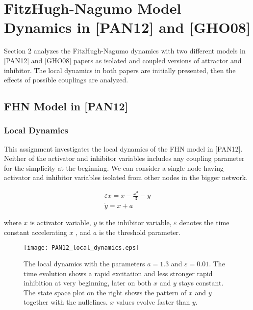 \documentclass[12pt]{article}
\begin{document}
\newpage

\section{FitzHugh-Nagumo Model Dynamics in [PAN12] and [GHO08]}

Section 2 analyzes the FitzHugh-Nagumo dynamics with two different models in [PAN12] and [GHO08] papers as isolated and coupled versions of attractor and inhibitor. The local dynamics in both papers are initially presented, then the effects of possible couplings are analyzed. 

\subsection{FHN Model in [PAN12]}

\subsubsection{Local Dynamics}

This assignment investigates the local dynamics of the FHN model in [PAN12]. Neither of the activator and inhibitor variables includes any coupling parameter for the simplicity at the beginning. We can consider a single node having activator and inhibitor variables isolated from other nodes in the bigger network. 
   
\begin{subequations} \begin{align} \varepsilon  \dot{x} = x - \frac{x^3}{3} -y   \label{eqn: frobenius 6}\\  \dot{y} = x+a \label{eqn: frobenius 7}   \end{align} 
\end{subequations}

where $x$ is activator variable, $y$ is the inhibitor variable, $\varepsilon$ denotes the time constant accelerating $x$ , and $a$ is the threshold parameter. 


\begin{figure}[h!]
	\centering
	\texttt{[image: PAN12\_local\_dynamics.eps]}
	\caption{The local dynamics with the parameters $a=1.3$ and $\varepsilon = 0.01$. The time evolution shows a rapid excitation and less stronger rapid inhibition at very beginning, later on both $x$ and $y$ stays constant. The state space plot on the right shows the pattern of $x$ and $y$ together with the nullclines. $x$ values evolve faster than $y$.}
\end{figure}
\end{document}

